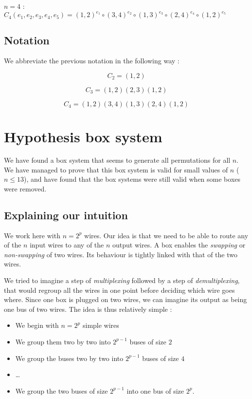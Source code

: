 \documentclass[11pt, a4paper]{article}
\begin{document}
$n=4$ : $C_4(e_1,e_2,e_3,e_4,e_5) = (1, 2)^{e_1} \circ (3,4)^{e_2} \circ
(1,3)^{e_3} \circ (2, 4)^{e_4} \circ (1,2)^{e_5}$

\subsection {Notation}

We abbreviate the previous notation in the following way :

$$C_2 = (1,2)$$

$$C_3 = (1,2)(2,3)(1,2)$$

$$C_4 = (1,2)(3,4)(1,3)(2,4)(1,2)$$

\section{Hypothesis box system}

We have found a box system that seems to generate all permutations for all $n$.
We have managed to prove that this box system is valid for small values of $n$
($n \leq 13$), and have found that the box systems were still valid when some
boxes were removed.

\subsection{Explaining our intuition}

We work here with $n = 2^p$ wires. Our idea is that we need to be able to route
any of the $n$ input wires to any of the $n$ output wires. A box enables the
{\em swapping} or {\em non-swapping} of two wires. Its behaviour is tightly
linked with that of the two wires.

We tried to imagine a step of {\em multiplexing} followed by a step of {\em
demultiplexing}, that would regroup all the wires in one point before deciding
which wire goes where. Since one box is plugged on two wires, we can imagine its
output as being one bus of two wires. The idea is thus relatively simple :

\begin{itemize}
	\item We begin with $n = 2^p$ simple wires
	\item We group them two by two into $2^{p-1}$ buses of size $2$
	\item We group the buses two by two into $2^{p-1}$ buses of size $4$
	\item \dots
	\item We group the two buses of size $2^{p-1}$ into one bus of size $2^p$.
\end{itemize}
\end{document}
